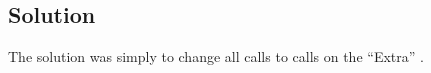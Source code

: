 \subsection{Solution}
The solution was simply to change all  calls to  calls on the ``Extra'' . 

 

